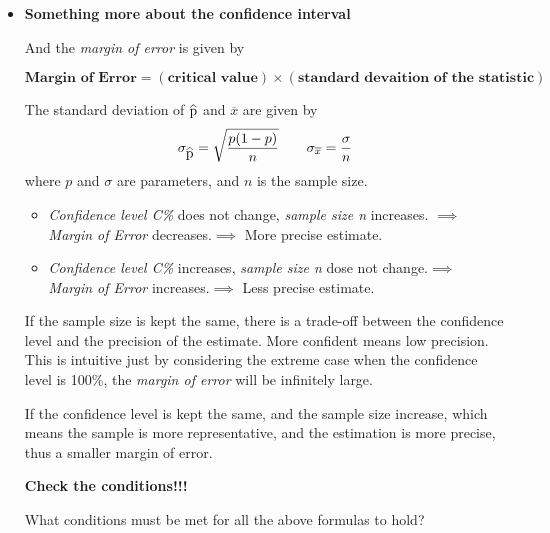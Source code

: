 \documentclass[a4paper, 12pt,twoside]{book}
\newcommand\reallywidehat[1]{%
\savestack{\tmpbox}{\stretchto{%
  \scaleto{%
    \scalerel*[\widthof{\ensuremath{#1}}]{\kern-.6pt\bigwedge\kern-.6pt}%
    {\rule[-\textheight/2]{1ex}{\textheight}}%
  }{\textheight}%
}{0.5ex}}%
\stackon[1pt]{#1}{\tmpbox}%
}
\begin{document}
\begin{itemize}
  
\item \textbf{Something more about the confidence interval}\vspace{0.3cm}

      And the \textit{margin of error} is given by
      
      \colorbox{babypink}{\parbox{\textwidth}{
                $$\textbf{Margin of Error} = (\textbf{critical value})\times (\textbf{standard devaition of the statistic})$$  
      }}\vspace{0.3cm}
      
       The standard deviation of $\reallywidehat{p}$ and $\overline{x}$ are given by
       $$\sigma_{\reallywidehat{p}} = \sqrt{\frac{p(1-p)}{n}} \qquad \sigma_{\overline{x}} = \frac{\sigma}{n}$$
       	where $p$ and $\sigma$ are parameters, and $n$ is the sample size.\vspace{0.3cm}
       	
       	\colorbox{babypink}{\parbox{\textwidth}{
       	\begin{itemize}[leftmargin = 0.5cm]
       	
       	    \item \textit{Confidence level C\%} does not change,  \textit{sample size n} increases. $\implies$\\
       	    
        \textit{Margin of Error} decreases.$\implies$ More precise estimate.\vspace{0.8cm}
        
          \item \textit{Confidence level C\%} increases,  \textit{sample size n} dose not change.$\implies$\\
       	    
        \textit{Margin of Error} increases.$\implies$ Less precise estimate.        
       	\end{itemize}
       	}}       	

If the sample size is kept the same, there is a trade-off between the confidence level and the precision of the estimate. More confident means low precision. This is intuitive just by considering the extreme case when the confidence level is 100\%, the \textit{margin of error} will be infinitely large.  \vspace{0.3cm}

If the confidence level is kept the same, and the sample size increase, which means the sample is more representative, and the estimation is more precise, thus a smaller margin of error.\vspace{0.3cm}

\colorbox{champagne}{\parbox{\textwidth}{
\textbf{Check the conditions!!!}\vspace{0.3cm}

  What conditions must be met for all the above formulas to hold?
}}

   \end{itemize}
\newpage
\end{document}
